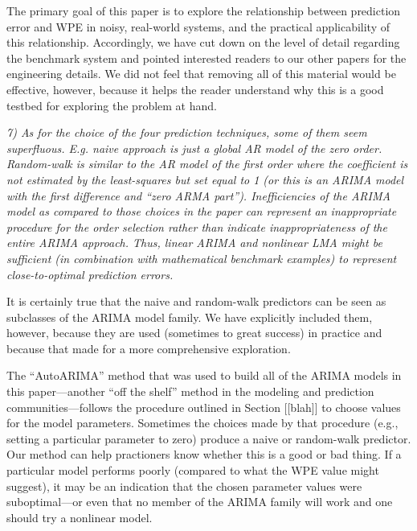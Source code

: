 \documentclass[12pt]{article}
\newcommand{\alert}[1]{{\color{red}#1}}
\begin{document}
The primary goal of this paper is to explore the relationship between
prediction error and WPE in noisy, real-world systems, and the
practical applicability of this relationship.  Accordingly, we have
cut down on the level of detail regarding the benchmark system and
pointed interested readers to our other papers for the engineering
details.  We did not feel that removing all of this material would
be effective, however, because it helps the reader understand why
this is a good testbed for exploring the problem at hand.

\smallskip

\emph{7) As for the choice of the four prediction techniques, some of
  them seem superfluous. E.g. naive approach is just a global AR model
  of the zero order.  Random-walk is similar to the AR model of the
  first order where the coefficient is not estimated by the
  least-squares but set equal to 1 (or this is an ARIMA model with the
  first difference and ``zero ARMA part''). Inefficiencies of the
  ARIMA model as compared to those choices in the paper can represent
  an inappropriate procedure for the order selection rather than
  indicate inappropriateness of the entire ARIMA approach. Thus,
  linear ARIMA and nonlinear LMA might be sufficient (in combination
  with mathematical benchmark examples) to represent close-to-optimal
  prediction errors.}

It is certainly true that the naive and random-walk predictors can be
seen as subclasses of the ARIMA model family.  We have explicitly
included them, however, because they are used (sometimes to great
success) in practice and because that made for a more comprehensive
exploration.  

The ``AutoARIMA'' method that was used to build all of the ARIMA
models in this paper---another ``off the shelf'' method in the
modeling and prediction communities---follows the procedure outlined
in Section \alert{[[blah]]} to choose values for the model parameters.
Sometimes the choices made by that procedure (e.g., setting a
particular parameter to zero) produce a naive or random-walk
predictor.  Our method can help practioners know whether this is a
good or bad thing.  If a particular model performs poorly (compared to
what the WPE value might suggest), it may be an indication that the
chosen parameter values were suboptimal---or even that no member of
the ARIMA family will work and one should try a nonlinear model.

\end{document}
